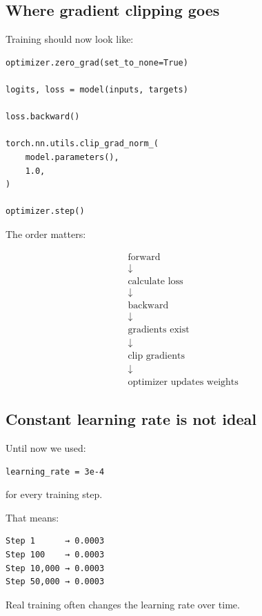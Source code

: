 \subsection{Where gradient clipping goes}

Training should now look like:

\begin{lstlisting}[style=shadedpython]
optimizer.zero_grad(set_to_none=True)

logits, loss = model(inputs, targets)

loss.backward()

torch.nn.utils.clip_grad_norm_(
    model.parameters(),
    1.0,
)

optimizer.step()
\end{lstlisting}

The order matters:

\[
\begin{aligned}
&\text{forward} \\
&\downarrow \\
&\text{calculate loss} \\
&\downarrow \\
&\text{backward} \\
&\downarrow \\
&\text{gradients exist} \\
&\downarrow \\
&\text{clip gradients} \\
&\downarrow \\
&\text{optimizer updates weights}
\end{aligned}
\]

\subsection{Constant learning rate is not ideal}

Until now we used:

\begin{lstlisting}[style=shadedpython,language={}]
learning_rate = 3e-4
\end{lstlisting}

for every training step.

That means:

\begin{lstlisting}[style=shadedpython,language={}]
Step 1      → 0.0003
Step 100    → 0.0003
Step 10,000 → 0.0003
Step 50,000 → 0.0003
\end{lstlisting}

Real training often changes the learning rate over time.

